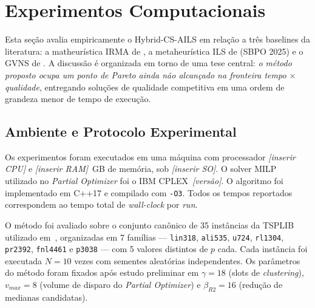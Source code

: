 
\section{Experimentos Computacionais}
\label{sec:results}

Esta seção avalia empiricamente o Hybrid-CS-AILS em relação a três baselines
da literatura: a matheurística IRMA de \cite{Stefanello2015}, a metaheurística
ILS de \cite{Freitas2025} (SBPO 2025) e o GVNS de \cite{Vasconcelos2023}.
A discussão é organizada em torno de uma tese central:
\emph{o método proposto ocupa um ponto de Pareto ainda não alcançado na
fronteira tempo $\times$ qualidade}, entregando soluções de qualidade
competitiva em uma ordem de grandeza menor de tempo de execução.

\subsection{Ambiente e Protocolo Experimental}
\label{sec:results:env}

Os experimentos foram executados em uma máquina com processador
\textit{[inserir CPU]} e \textit{[inserir RAM]}~GB de memória, sob
\textit{[inserir SO]}. O solver MILP utilizado no \emph{Partial Optimizer}
foi o \textsc{IBM CPLEX}~\textit{[versão]}. O algoritmo foi implementado em
C++17 e compilado com \texttt{-O3}. Todos os tempos reportados
correspondem ao tempo total de \emph{wall-clock} por \emph{run}.

O método foi avaliado sobre o conjunto canônico de 35 instâncias da
TSPLIB utilizado em~\cite{Stefanello2015}, organizadas em 7 famílias
--- \texttt{lin318}, \texttt{ali535}, \texttt{u724}, \texttt{rl1304},
\texttt{pr2392}, \texttt{fnl4461} e \texttt{p3038} --- com 5 valores
distintos de $p$ cada. Cada instância foi executada
$N=10$ vezes com sementes aleatórias independentes. Os parâmetros do
método foram fixados após estudo preliminar em
$\gamma=18$ (slots de \emph{clustering}), $v_{max}=8$
(volume de disparo do \emph{Partial Optimizer}) e $\beta_{R2}=16$
(redução de medianas candidatas).

